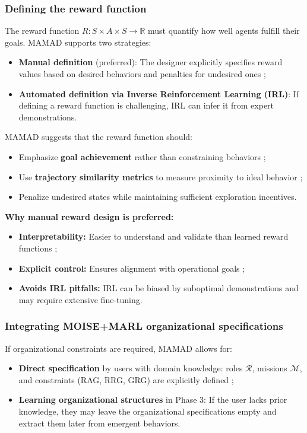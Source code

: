 \documentclass[journal]{IEEEtai}
\begin{document}
\subsubsection{Defining the reward function}
The reward function $R: S \times A \times S \to \mathbb{R}$ must quantify how well agents fulfill their goals. MAMAD supports two strategies:
\begin{itemize}
    \item \textbf{Manual definition} (preferred): The designer explicitly specifies reward values based on desired behaviors and penalties for undesired ones ;
    \item \textbf{Automated definition via Inverse Reinforcement Learning (IRL)}: If defining a reward function is challenging, IRL can infer it from expert demonstrations.
\end{itemize}

MAMAD suggests that the reward function should:
\begin{itemize}
    \item Emphasize \textbf{goal achievement} rather than constraining behaviors ;
    \item Use \textbf{trajectory similarity metrics} to measure proximity to ideal behavior ;
    \item Penalize undesired states while maintaining sufficient exploration incentives.
\end{itemize}

\noindent \textbf{Why manual reward design is preferred:}
\begin{itemize}
    \item \textbf{Interpretability:} Easier to understand and validate than learned reward functions ;
    \item \textbf{Explicit control:} Ensures alignment with operational goals ;
    \item \textbf{Avoids IRL pitfalls:} IRL can be biased by suboptimal demonstrations and may require extensive fine-tuning.
\end{itemize}

\subsubsection{Integrating MOISE+MARL organizational specifications}
If organizational constraints are required, MAMAD allows for:
\begin{itemize}
    \item \textbf{Direct specification} by users with domain knowledge: roles $\mathcal{R}$, missions $\mathcal{M}$, and constraints (RAG, RRG, GRG) are explicitly defined ;
    \item \textbf{Learning organizational structures} in Phase 3: If the user lacks prior knowledge, they may leave the organizational specifications empty and extract them later from emergent behaviors.
\end{itemize}
\end{document}
